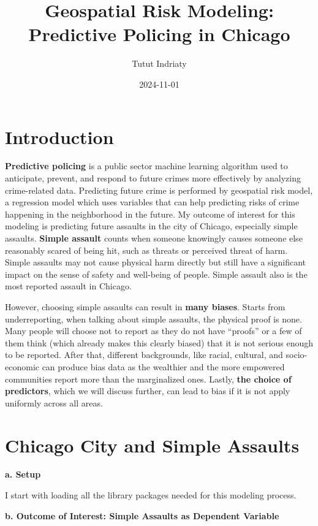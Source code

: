 \documentclass[
]{article}
\title{Geospatial Risk Modeling: Predictive Policing in Chicago}
\author{Tutut Indriaty}
\date{2024-11-01}
\begin{document}
\maketitle

{
\setcounter{tocdepth}{2}
\tableofcontents
}
\section{Introduction}\label{introduction}

\textbf{Predictive policing} is a public sector machine learning
algorithm used to anticipate, prevent, and respond to future crimes more
effectively by analyzing crime-related data. Predicting future crime is
performed by geospatial risk model, a regression model which uses
variables that can help predicting risks of crime happening in the
neighborhood in the future. My outcome of interest for this modeling is
predicting future assaults in the city of Chicago, especially simple
assaults. \textbf{Simple assault} counts when someone knowingly causes
someone else reasonably scared of being hit, such as threats or
perceived threat of harm. Simple assaults may not cause physical harm
directly but still have a significant impact on the sense of safety and
well-being of people. Simple assault also is the most reported assault
in Chicago.

However, choosing simple assaults can result in \textbf{many biases}.
Starts from underreporting, when talking about simple assaults, the
physical proof is none. Many people will choose not to report as they do
not have ``proofs'' or a few of them think (which already makes this
clearly biased) that it is not serious enough to be reported. After
that, different backgrounds, like racial, cultural, and socio-economic
can produce bias data as the wealthier and the more empowered
communities report more than the marginalized ones. Lastly, \textbf{the
choice of predictors}, which we will discuss further, can lead to bias
if it is not apply uniformly across all areas.

\section{Chicago City and Simple
Assaults}\label{chicago-city-and-simple-assaults}

\textbf{a. Setup}

I start with loading all the library packages needed for this modeling
process.

\textbf{b. Outcome of Interest: Simple Assaults as Dependent Variable}
\end{document}
